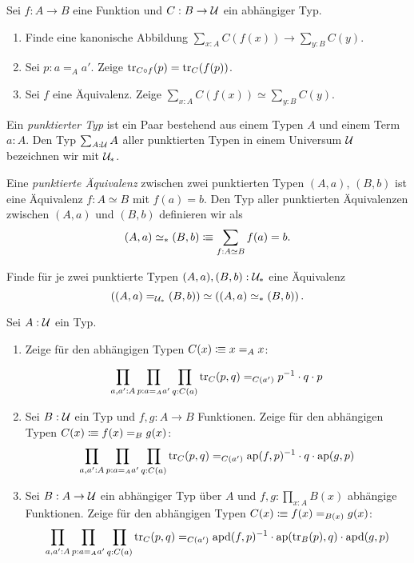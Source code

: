 \documentclass{uebung}
\begin{document}

\begin{exercise}
  Sei $f:A \to B$ eine Funktion und $C : B \to \mathcal{U}$ ein abhängiger Typ.
  \begin{enumerate}
    \item Finde eine kanonische Abbildung $\sum_{x:A} C(f(x)) \to \sum_{y:B} C(y)$.
    \item Sei $p:a=_A a'$. 
      Zeige $\mathrm{tr}_{C\circ f}(p) = \mathrm{tr}_C (f(p))$.
    \item Sei $f$ eine Äquivalenz.
      Zeige $\sum_{x:A} C(f(x)) \simeq \sum_{y:B} C(y)$.
  \end{enumerate}
\end{exercise}

\begin{exercise}
  Ein \emph{punktierter Typ} ist ein Paar bestehend aus einem Typen $A$ und einem Term $a:A$.
  Den Typ $\sum_{A:\mathcal{U}}A$ aller punktierten Typen in einem Universum $\mathcal{U}$ bezeichnen wir mit $\mathcal{U}_*$.

  Eine \emph{punktierte Äquivalenz} zwischen zwei punktierten Typen $(A,a)$, $(B,b)$ ist eine Äquivalenz $f:A\simeq B$ mit $f(a)=b$.
  Den Typ aller punktierten Äquivalenzen zwischen $(A,a)$ und $(B,b)$ definieren wir als
  $$
  (A,a) \simeq_* (B,b) \vcentcolon\mspace{-1.2mu}\equiv \sum_{f:A\simeq B} f(a) = b.
  $$

  Finde für je zwei punktierte Typen $(A,a), (B,b) : \mathcal{U}_*$ eine Äquivalenz
  $$
  \left((A,a) =_{\mathcal{U}_*} (B,b)\right) \simeq \left((A,a) \simeq_* (B,b)\right).
  $$
\end{exercise}

\begin{exercise}
  Sei $A:\mathcal{U}$ ein Typ.
  \begin{enumerate}
    \item Zeige für den abhängigen Typen $C(x)\vcentcolon\mspace{-1.2mu}\equiv x =_A x$:

      $$
      \prod_{a,a':A}\prod_{p:a =_A a'} \prod_{q:C(a)} \mathrm{tr}_C (p,q) =_{C(a')} p^{-1} \cdot q \cdot p
      $$
    \item Sei $B:\mathcal{U}$ ein Typ und $f,g : A \to B$ Funktionen.
      Zeige für den abhängigen Typen $C(x) \vcentcolon\mspace{-1.2mu}\equiv f(x)=_{B} g(x)$:
      $$
      \prod_{a,a':A}\prod_{p:a =_A a'} \prod_{q:C(a)} \mathrm{tr}_C (p,q) =_{C(a')} \mathrm{ap}(f,p)^{-1} \cdot q \cdot \mathrm{ap}(g,p)
      $$
    \item Sei $B:A \to \mathcal{U}$ ein abhängiger Typ über $A$ und $f,g:\prod_{x:A} B(x)$ abhängige Funktionen.
      Zeige für den abhängigen Typen $C(x) \vcentcolon\mspace{-1.2mu}\equiv f(x)=_{B(x)} g(x)$:
      $$
      \prod_{a,a':A}\prod_{p:a =_A a'} \prod_{q:C(a)} \mathrm{tr}_C (p,q) =_{C(a')} \mathrm{apd}(f,p)^{-1} \cdot \mathrm{ap}(\mathrm{tr}_B(p),q) \cdot \mathrm{apd}(g,p)
      $$
  \end{enumerate}
\end{exercise}
\end{document}
